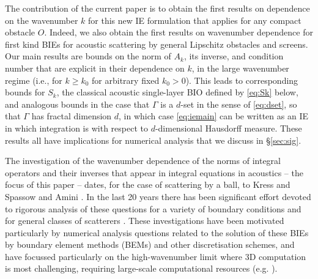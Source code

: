 \documentclass{birkjour}
\theoremstyle{definition}
\theoremstyle{remark}
\numberwithin{equation}{section}
\begin{document}
The contribution of the current paper is to obtain the first results on dependence on the wavenumber $k$ for this new IE formulation that applies for any compact obstacle $O$. Indeed, we also obtain the first results on wavenumber dependence for first kind BIEs for acoustic scattering by general Lipschitz obstacles and screens. Our main results are bounds on the norm of  $A_k$, its inverse, and condition number that are explicit in their dependence on $k$, in the large wavenumber regime (i.e., for $k\geq k_0$ for arbitrary fixed $k_0>0$). This leads to corresponding bounds for $S_k$, the classical acoustic single-layer BIO defined by \eqref{eq:Sk} below, and analogous bounds in the case that $\Gamma$ is a $d$-set in the sense of \eqref{eq:dset}, so that $\Gamma$ has fractal dimension $d$, in which case \eqref{eq:iemain} can be written as an IE in which integration is with respect to $d$-dimensional Hausdorff measure. These results all have implications for numerical analysis that we discuss  in  \S\ref{sec:sig}. %

 The investigation of 
the wavenumber dependence of the norms of integral operators and their inverses that appear in  integral equations in acoustics -- the focus of this paper -- dates, for the case of scattering by a ball, to Kress and Spassow \cite{KrSp83,Kr85} and Amini \cite{Am90}.
In the last 20 years there has been significant effort devoted to rigorous analysis of these questions for a variety of boundary conditions and for general classes of scatterers \cite{ChHe:06,BaSa2007,BufSau07,DomGra07,CWMonk2008,ChGrLaLi:09,SpeCha11,BetCha11,chandler2012numerical,Me:12,BoTu2013,spence2014wavenumber,CWHewett2015,HaTa:15,SpKaSm:15,baskin2016sharp,GaSp2019,chandler2020high,lafontaine2021most,GaMaSpe2022,SiavashSimon1}. These investigations have been motivated particularly by numerical analysis questions related to the solution of these BIEs by boundary element methods (BEMs) and other discretisation schemes, and have focussed particularly on the high-wavenumber limit where 3D computation is most challenging, requiring large-scale computational resources (e.g. \cite{WoGeBeAr2015,ChDeCi2017,AmChLo2019,LiAtDe2024}).
\end{document}
